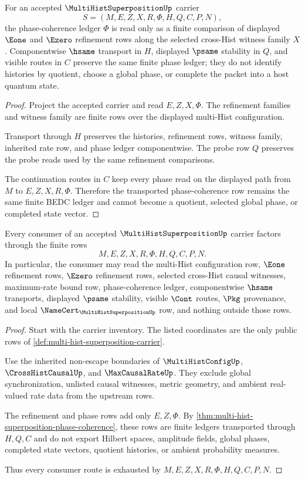 \begin{theorem}
\label{thm:multi-hist-superposition-phase-coherence}
For an accepted $\MultiHistSuperpositionUp$ carrier
$$
S=(M,E,Z,X,R,\Phi,H,Q,C,P,N),
$$
the phase-coherence ledger $\Phi$ is read only as a finite comparison of displayed $\Eone$ and $\Ezero$ refinement rows along the selected cross-Hist witness family $X$. Componentwise $\hsame$ transport in $H$, displayed $\psame$ stability in $Q$, and visible routes in $C$ preserve the same finite phase ledger; they do not identify histories by quotient, choose a global phase, or complete the packet into a host quantum state.
\end{theorem}
\begin{proof}
Project the accepted carrier and read $E,Z,X,\Phi$. The refinement families and witness family are finite rows over the displayed multi-Hist configuration.

Transport through $H$ preserves the histories, refinement rows, witness family, inherited rate row, and phase ledger componentwise. The probe row $Q$ preserves the probe reads used by the same refinement comparisons.

The continuation routes in $C$ keep every phase read on the displayed path from $M$ to $E,Z,X,R,\Phi$. Therefore the transported phase-coherence row remains the same finite BEDC ledger and cannot become a quotient, selected global phase, or completed state vector.
\end{proof}

\begin{theorem}
\label{thm:multi-hist-superposition-nonescape}
Every consumer of an accepted $\MultiHistSuperpositionUp$ carrier factors through the finite rows
$$
M,E,Z,X,R,\Phi,H,Q,C,P,N.
$$
In particular, the consumer may read the multi-Hist configuration row, $\Eone$ refinement rows, $\Ezero$ refinement rows, selected cross-Hist causal witnesses, maximum-rate bound row, phase-coherence ledger, componentwise $\hsame$ transports, displayed $\psame$ stability, visible $\Cont$ routes, $\Pkg$ provenance, and local $\NameCert_{\MultiHistSuperpositionUp}$ row, and nothing outside those rows.
\end{theorem}
\begin{proof}
Start with the carrier inventory. The listed coordinates are the only public rows of \autoref{def:multi-hist-superposition-carrier}.

Use the inherited non-escape boundaries of $\MultiHistConfigUp$, $\CrossHistCausalUp$, and $\MaxCausalRateUp$. They exclude global synchronization, unlisted causal witnesses, metric geometry, and ambient real-valued rate data from the upstream rows.

The refinement and phase rows add only $E,Z,\Phi$. By \autoref{thm:multi-hist-superposition-phase-coherence}, these rows are finite ledgers transported through $H,Q,C$ and do not export Hilbert spaces, amplitude fields, global phases, completed state vectors, quotient histories, or ambient probability measures.

Thus every consumer route is exhausted by $M,E,Z,X,R,\Phi,H,Q,C,P,N$.
\end{proof}

